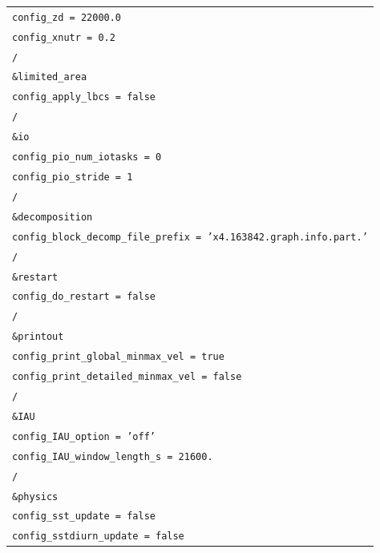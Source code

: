 \documentclass[12pt,a4paper,oneside]{book}
\providecommand{\arraybackslash}{\tabularnewline}
\begin{document}
\begin{longtable}[]{@{}
  >{\raggedright\arraybackslash}p{}@{}}
\texttt{\hspace*{1em}config\_zd = 22000.0} \\
\texttt{\hspace*{1em}config\_xnutr = 0.2} \\
\texttt{/} \\
\texttt{\&limited\_area} \\
\texttt{\hspace*{1em}config\_apply\_lbcs = false} \\
\texttt{/} \\
\texttt{\&io} \\
\texttt{\hspace*{1em}config\_pio\_num\_iotasks = 0} \\
\texttt{\hspace*{1em}config\_pio\_stride = 1} \\
\texttt{/} \\
\texttt{\&decomposition} \\
\texttt{\hspace*{1em}config\_block\_decomp\_file\_prefix = 'x4.163842.graph.info.part.'} \\
\texttt{/} \\
\texttt{\&restart} \\
\texttt{\hspace*{1em}config\_do\_restart = false} \\
\texttt{/} \\
\texttt{\&printout} \\
\texttt{\hspace*{1em}config\_print\_global\_minmax\_vel = true} \\
\texttt{\hspace*{1em}config\_print\_detailed\_minmax\_vel = false} \\
\texttt{/} \\
\texttt{\&IAU} \\
\texttt{\hspace*{1em}config\_IAU\_option = 'off'} \\
\texttt{\hspace*{1em}config\_IAU\_window\_length\_s = 21600.} \\
\texttt{/} \\
\texttt{\&physics} \\
\texttt{\hspace*{1em}config\_sst\_update = false} \\
\texttt{\hspace*{1em}config\_sstdiurn\_update = false} \\

\end{longtable}
\end{document}
